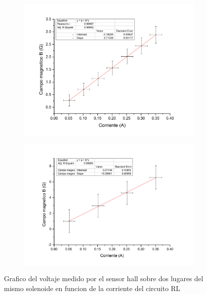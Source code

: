 \documentclass[11pt,a4paper]{article}
\begin{document}
\begin{figure}[H]
	\begin{subfigure}{0.5\textwidth}
		\centering
		\includegraphics[scale=0.35]{Campo_vs_Corriente_BL_Arriba}
      \label{subfig:CC-Arriba}
	\end{subfigure}
	\begin{subfigure}{0.5\textwidth}
		\centering
		\includegraphics[scale=0.35]{Campo_vs_Corriente_BL_Centro}
      \label{subfig:CC-Centro}      
	\end{subfigure}
\caption{Grafico del voltaje medido por el sensor hall sobre dos lugares del mismo solenoide en funcion de la corriente del circuito RL }
\end{figure}
\end{document}

